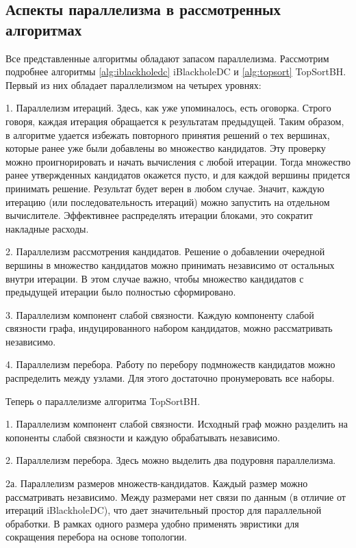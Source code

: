 \documentclass[12pt,a4paper,oneside,openany]{article}
\theoremstyle{definition}
\theoremstyle{lemma}
\theoremstyle{remark}
\begin{document}
\subsection{Аспекты параллелизма в рассмотренных алгоритмах}\label{subsec:parallelresource}

Все представленные алгоритмы обладают запасом параллелизма.
Рассмотрим подробнее алгоритмы \ref{alg:iblackholedc} iBlackholeDC и \ref{alg:topsort} TopSortBH.
Первый из них обладает параллелизмом на четырех уровнях:

1. Параллелизм итераций. Здесь, как уже упоминалось, есть оговорка.
Строго говоря, каждая итерация обращается к результатам предыдущей.
Таким образом, в алгоритме удается избежать повторного принятия решений о тех вершинах,
которые ранее уже были добавлены во множество кандидатов.
Эту проверку можно проигнорировать и начать вычисления с любой итерации.
Тогда множество ранее утвержденных кандидатов окажется пусто, и для
каждой вершины придется принимать решение. Результат будет верен в любом случае.
Значит, каждую итерацию (или последовательность итераций) можно запустить на отдельном вычислителе.
Эффективнее распределять итерации блоками, это сократит накладные расходы.

2. Параллелизм рассмотрения кандидатов. Решение о добавлении очередной вершины
в множество кандидатов можно принимать независимо от остальных внутри итерации.
В этом случае важно, чтобы множество кандидатов с предыдущей итерации было полностью сформировано.

3. Параллелизм компонент слабой связности. Каждую компоненту слабой связности графа, индуцированного
набором кандидатов, можно рассматривать независимо.

4. Параллелизм перебора. Работу по перебору подмножеств кандидатов можно распределить между узлами.
Для этого достаточно пронумеровать все наборы.

Теперь о параллелизме алгоритма TopSortBH.

1. Параллелизм компонент слабой связности. Исходный граф можно разделить на копоненты слабой связности
и каждую обрабатывать независимо.

2. Параллелизм перебора. Здесь можно выделить два подуровня параллелизма.

2а. Параллелизм размеров множеств-кандидатов. Каждый размер можно рассматривать независимо.
Между размерами нет связи по данным (в отличие от итераций iBlackholeDC), что дает значительный простор
для параллельной обработки.
В рамках одного размера удобно применять эвристики для сокращения перебора на основе топологии.
\end{document}
